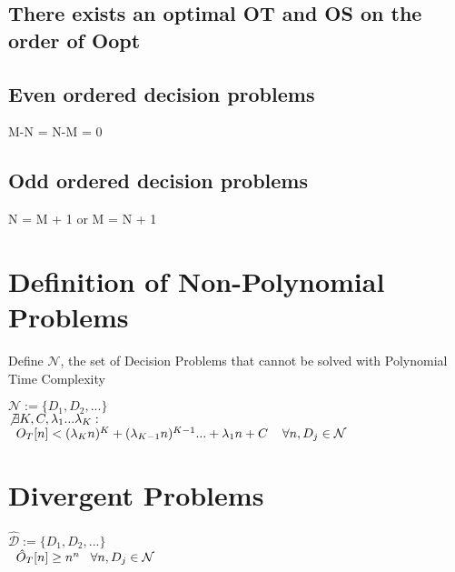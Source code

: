 \documentclass[11pt]{article}
\begin{document}
\subsection{There exists an optimal OT and OS on the order of Oopt}

\subsection{Even ordered decision problems}
M-N = N-M = 0
\subsection{Odd ordered decision problems}
N = M + 1 or M = N + 1























\newpage
\section{Definition of Non-Polynomial Problems}
Define $\mathcal{N}$, the set of Decision Problems that cannot be solved with Polynomial Time Complexity
\begin{center}
$
\mathcal{N} := \{ D_1,D_2,...\} 
$
\\
$ 
\not \exists K,C,\lambda_1...\lambda_K : \hspace{2mm}
$
\\
$
\hspace{2mm} O_T[n] < (\lambda_K n)^K + (\lambda_{K-1} n)^{K-1}... + \lambda_1 n + C \hspace{4mm} \forall n, D_j \in \mathcal{N}
$
\end{center}






\section{Divergent Problems}
\begin{center}
$
\mathcal{\hat{D}} := \{ D_1,D_2,...\} 
$
\\ \vspace{2mm}
$
\hspace{2mm} \hat{O}_T[n] \geq n^n \hspace{3mm} \forall n, D_j \in \mathcal{N}
$
\end{center}
\end{document}
